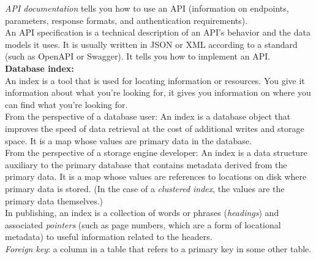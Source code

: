 \documentclass[12pt, titlepage]{article}
\begin{document}
\textit{API documentation} tells you how to use an API (information on endpoints, parameters, response formats, and authentication requirements). \\

An API specification is a technical description of an API's behavior and the data models it uses. It is usually written in JSON or XML according to a standard (such as OpenAPI or Swagger). It tells you how to implement an API. \\

\textbf{Database index:} \\

An index is a tool that is used for locating information or resources. You give it information about what you're looking for, it gives you information on where you can find what you're looking for. \\

From the perspective of a database user: An index is a database object that improves the speed of data retrieval at the cost of additional writes and storage space. It is a map whose values are primary data in the database. \\

From the perspective of a storage engine developer: An index is a data structure auxiliary to the primary database that contains metadata derived from the primary data. It is a map whose values are references to locations on disk where primary data is stored. (In the case of a \textit{clustered index}, the values are the primary data themselves.) \\

In publishing, an index is a collection of words or phrases (\textit{headings}) and associated \textit{pointers} (such as page numbers, which are a form of locational metadata) to useful information related to the headers. \\

\textit{Foreign key}: a column in a table that refers to a primary key in some other table.
\end{document}
